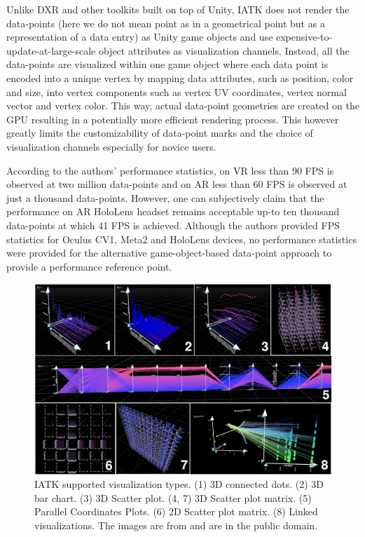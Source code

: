 \documentclass{vgtc}                          %
\begin{document}
\noindent Unlike DXR and other toolkits built on top of Unity, IATK does not
render the data-points (here we do not mean point as in a geometrical point but
as a representation of a data entry) as Unity game objects and use
expensive-to-update-at-large-scale object attributes as visualization channels.
Instead, all the data-points are visualized within one game object where each
data point is encoded into a unique vertex by mapping data attributes,
such as position, color and size, into vertex components such as vertex UV
coordinates, vertex normal vector and vertex color. This way, actual data-point
geometries are created on the GPU resulting in a potentially more
efficient rendering process. This however greatly limits the customizability
of data-point marks and the choice of visualization channels especially for
novice users.

\smallskip

\noindent According to the authors' performance statistics, on VR less than
90 FPS is observed at two million data-points and on AR less than 60 FPS is
observed at just a thousand data-points. However, one can subjectively claim
that the performance on AR HoloLens headset remains acceptable up-to ten
thousand data-points at which 41 FPS is achieved. Although the authors provided
FPS statistics for Oculus CV1, Meta2 and HoloLens devices, no performance
statistics were provided for the alternative game-object-based data-point
approach to provide a performance reference point.

\begin{figure}[tb]
	\centering
	\includegraphics[width=\columnwidth]{iatk}
	\caption[Caption for IATK]{IATK supported visualization types. (1) 3D
		connected dots. (2) 3D bar chart. (3) 3D Scatter plot. (4, 7) 3D
		Scatter plot matrix. (5) Parallel Coordinates Plots. (6) 2D Scatter plot
        matrix. (8) Linked visualizations. The images are from \cite{iatk:repo}
		and are in the public domain.}
	\label{fig:iatk_visualizations}
\end{figure}
\end{document}
